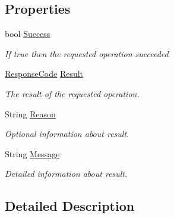 \subsection*{Properties}
\begin{DoxyCompactItemize}
\item 
bool \hyperlink{classcom_1_1clover_1_1remotepay_1_1sdk_1_1_base_response_a26eb8731f844ac210c003aef421edcb0}{Success}
\begin{DoxyCompactList}\small\item\em If true then the requested operation succeeded \end{DoxyCompactList}\item 
\hyperlink{namespacecom_1_1clover_1_1remotepay_1_1sdk_ad35c0938efdc4d31c4a040db886ad0f3}{Response\+Code} \hyperlink{classcom_1_1clover_1_1remotepay_1_1sdk_1_1_base_response_a53831dfbfa294ff337b8e9f745e163ad}{Result}
\begin{DoxyCompactList}\small\item\em The result of the requested operation. \end{DoxyCompactList}\item 
String \hyperlink{classcom_1_1clover_1_1remotepay_1_1sdk_1_1_base_response_a7d7f71bc43c375b70016d9f024837ccc}{Reason}
\begin{DoxyCompactList}\small\item\em Optional information about result. \end{DoxyCompactList}\item 
String \hyperlink{classcom_1_1clover_1_1remotepay_1_1sdk_1_1_base_response_ac97b22a1e1f5a07482461a2b2557892c}{Message}
\begin{DoxyCompactList}\small\item\em Detailed information about result. \end{DoxyCompactList}\end{DoxyCompactItemize}


\subsection{Detailed Description}




